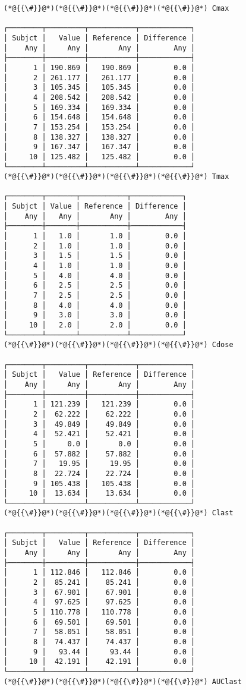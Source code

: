 \documentclass[12pt,a4paper]{article}
\begin{document}
\begin{lstlisting}
(*@{{\#}}@*)(*@{{\#}}@*)(*@{{\#}}@*)(*@{{\#}}@*) Cmax

┌────────┬─────────┬───────────┬────────────┐
│ Subjct │   Value │ Reference │ Difference │
│    Any │     Any │       Any │        Any │
├────────┼─────────┼───────────┼────────────┤
│      1 │ 190.869 │   190.869 │        0.0 │
│      2 │ 261.177 │   261.177 │        0.0 │
│      3 │ 105.345 │   105.345 │        0.0 │
│      4 │ 208.542 │   208.542 │        0.0 │
│      5 │ 169.334 │   169.334 │        0.0 │
│      6 │ 154.648 │   154.648 │        0.0 │
│      7 │ 153.254 │   153.254 │        0.0 │
│      8 │ 138.327 │   138.327 │        0.0 │
│      9 │ 167.347 │   167.347 │        0.0 │
│     10 │ 125.482 │   125.482 │        0.0 │
└────────┴─────────┴───────────┴────────────┘
(*@{{\#}}@*)(*@{{\#}}@*)(*@{{\#}}@*)(*@{{\#}}@*) Tmax

┌────────┬───────┬───────────┬────────────┐
│ Subjct │ Value │ Reference │ Difference │
│    Any │   Any │       Any │        Any │
├────────┼───────┼───────────┼────────────┤
│      1 │   1.0 │       1.0 │        0.0 │
│      2 │   1.0 │       1.0 │        0.0 │
│      3 │   1.5 │       1.5 │        0.0 │
│      4 │   1.0 │       1.0 │        0.0 │
│      5 │   4.0 │       4.0 │        0.0 │
│      6 │   2.5 │       2.5 │        0.0 │
│      7 │   2.5 │       2.5 │        0.0 │
│      8 │   4.0 │       4.0 │        0.0 │
│      9 │   3.0 │       3.0 │        0.0 │
│     10 │   2.0 │       2.0 │        0.0 │
└────────┴───────┴───────────┴────────────┘
(*@{{\#}}@*)(*@{{\#}}@*)(*@{{\#}}@*)(*@{{\#}}@*) Cdose

┌────────┬─────────┬───────────┬────────────┐
│ Subjct │   Value │ Reference │ Difference │
│    Any │     Any │       Any │        Any │
├────────┼─────────┼───────────┼────────────┤
│      1 │ 121.239 │   121.239 │        0.0 │
│      2 │  62.222 │    62.222 │        0.0 │
│      3 │  49.849 │    49.849 │        0.0 │
│      4 │  52.421 │    52.421 │        0.0 │
│      5 │     0.0 │       0.0 │        0.0 │
│      6 │  57.882 │    57.882 │        0.0 │
│      7 │   19.95 │     19.95 │        0.0 │
│      8 │  22.724 │    22.724 │        0.0 │
│      9 │ 105.438 │   105.438 │        0.0 │
│     10 │  13.634 │    13.634 │        0.0 │
└────────┴─────────┴───────────┴────────────┘
(*@{{\#}}@*)(*@{{\#}}@*)(*@{{\#}}@*)(*@{{\#}}@*) Clast

┌────────┬─────────┬───────────┬────────────┐
│ Subjct │   Value │ Reference │ Difference │
│    Any │     Any │       Any │        Any │
├────────┼─────────┼───────────┼────────────┤
│      1 │ 112.846 │   112.846 │        0.0 │
│      2 │  85.241 │    85.241 │        0.0 │
│      3 │  67.901 │    67.901 │        0.0 │
│      4 │  97.625 │    97.625 │        0.0 │
│      5 │ 110.778 │   110.778 │        0.0 │
│      6 │  69.501 │    69.501 │        0.0 │
│      7 │  58.051 │    58.051 │        0.0 │
│      8 │  74.437 │    74.437 │        0.0 │
│      9 │   93.44 │     93.44 │        0.0 │
│     10 │  42.191 │    42.191 │        0.0 │
└────────┴─────────┴───────────┴────────────┘
(*@{{\#}}@*)(*@{{\#}}@*)(*@{{\#}}@*)(*@{{\#}}@*) AUClast


\end{lstlisting}
\end{document}
